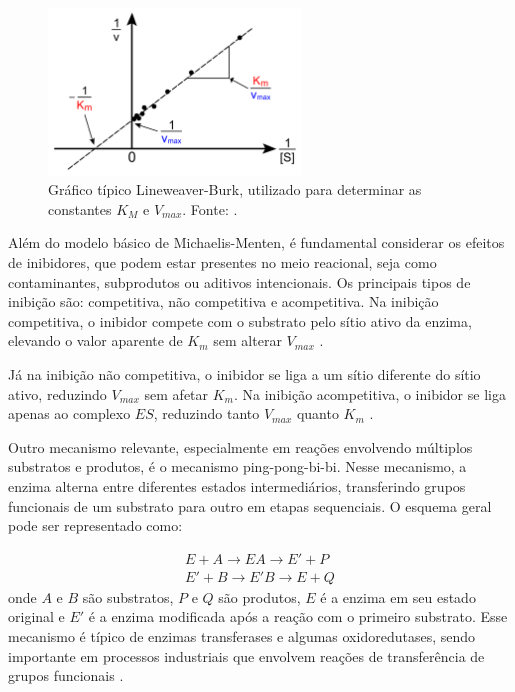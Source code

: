 \documentclass[12pt,oneside]{report}
\begin{document}
\begin{figure}[H]
    \centering
    \includegraphics[width=0.6\textwidth]{img/LB.png}
    \caption{\small Gráfico típico Lineweaver-Burk, utilizado para determinar as constantes $K_M$ e $V_{max}$. Fonte: .}
    \label{fig:lineweaver_burk}
\end{figure}

Além do modelo básico de Michaelis-Menten, é fundamental considerar os efeitos de inibidores, que podem estar presentes no meio reacional, seja como contaminantes, subprodutos ou aditivos intencionais. Os principais tipos de inibição são: competitiva, não competitiva e acompetitiva. Na inibição competitiva, o inibidor compete com o substrato pelo sítio ativo da enzima, elevando o valor aparente de
$K_m$ sem alterar $V_{max}$ \cite{FOGLER_2016}.

Já na inibição não competitiva, o inibidor se liga a um sítio diferente do sítio ativo, reduzindo $V_{max}$ sem afetar $K_m$. Na inibição acompetitiva, o inibidor se liga apenas ao complexo $ES$, reduzindo tanto $V_{max}$ quanto $K_m$ \cite{FOGLER_2016}.

Outro mecanismo relevante, especialmente em reações envolvendo múltiplos substratos e produtos, é o mecanismo ping-pong-bi-bi. Nesse mecanismo, a enzima alterna entre diferentes estados intermediários, transferindo grupos funcionais de um substrato para outro em etapas sequenciais. O esquema geral pode ser representado como:

\begin{equation}
    \begin{aligned}
        E + A \rightarrow EA \rightarrow E' + P \\
        E' + B \rightarrow E'B \rightarrow E + Q
    \end{aligned}
\end{equation}
onde $A$ e $B$ são substratos, $P$ e $Q$ são produtos, $E$ é a enzima em seu estado original e $E'$ é a enzima modificada após a reação com o primeiro substrato. Esse mecanismo é típico de enzimas transferases e algumas oxidoredutases, sendo importante em processos industriais que envolvem reações de transferência de grupos funcionais \cite{FOGLER_2016}.
\end{document}
